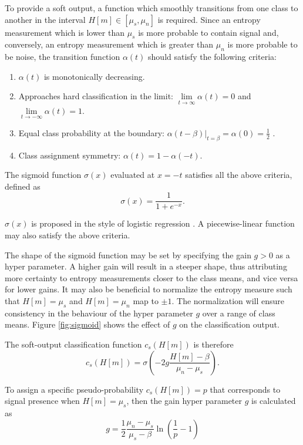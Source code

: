 To provide a soft output, a function which smoothly transitions from one class to another in the interval $H[m] \in [\mu_s, \mu_n]$ is required. Since an entropy measurement which is lower than $\mu_s$ is more probable to contain signal and, conversely, an entropy measurement which is greater than $\mu_n$ is more probable to be noise, the transition function $\alpha(t)$ should satisfy the following criteria:
\begin{enumerate}
	\item  $\alpha(t)$ is monotonically decreasing.
	\item Approaches hard classification in the limit: $\lim\limits_{t \rightarrow \infty} \alpha(t) = 0$ and $\lim\limits_{t \rightarrow -\infty} \alpha(t) = 1$.
	\item Equal class probability at the boundary: $\alpha(t - \beta) |_{t=\beta} = \alpha(0) =  \frac{1}{2}$ .
	\item Class assignment symmetry: $\alpha(t) = 1 - \alpha(-t)$.
\end{enumerate}

The sigmoid function $\sigma(x)$ evaluated at $x = -t$ satisfies all the above criteria, defined as
\begin{equation*}
	\sigma(x) = \frac{1}{1 + e^{-x}}.
\end{equation*}

$\sigma(x)$ is proposed in the style of logistic regression \citep{logit}. A piecewise-linear function may also satisfy the above criteria.

The shape of the sigmoid function may be set by specifying the gain $g > 0$ as a hyper parameter. A higher gain will result in a steeper shape, thus attributing more certainty to entropy measurements closer to the class means, and vice versa for lower gains. It may also be beneficial to normalize the entropy measure such that $H[m] = \mu_s$ and $H[m] = \mu_n$ map to $\pm1$. The normalization will ensure consistency in the behaviour of the hyper parameter $g$ over a range of class means. Figure \ref{fig:sigmoid} shows the effect of $g$ on the classification output.

The soft-output classification function $c_{s}(H[m])$ is therefore
\begin{equation*}
	c_{s}(H[m]) = \sigma\left(	-2g	\frac{H[m] - \beta}{\mu_n - \mu_s}	\right).
\end{equation*}

To assign a specific pseudo-probability $c_{s}(H[m]) = p$ that corresponds to signal presence when $H[m] = \mu_s$, then the gain hyper parameter $g$ is calculated as
\begin{equation}
	\label{eqn:sigmoidg}
	g = \frac{1}{2} \frac{\mu_n - \mu_s}{\mu_s - \beta} \ln\left(\frac{1}{p} - 1\right)
\end{equation}

